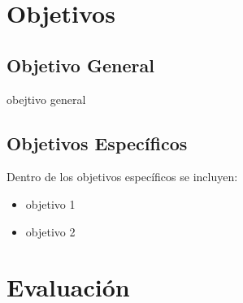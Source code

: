 \section{Objetivos}
\label{sec:objetivos}

\subsection{Objetivo General}

obejtivo general

\subsection{Objetivos Específicos}
Dentro de los objetivos específicos se incluyen:
   \begin{itemize}
   \item objetivo 1
   \item objetivo 2
   \end{itemize}
\iffalse
\section{Hipótesis}
\label{sec:hipotesis}

Las técnicas de ...

\subsection{Variables}
\subsubsection{Variables Independientes}
En el procesamiento de imágenes existen variables ...
\begin{itemize}
\item \textbf{variable 1},  Descripción de variable 1
\item \textbf{variable 2},  Descripción de variable 2
\end{itemize}
\subsubsection{Variables Dependientes}
Como variable dependiente ... 
\fi 

\section{Evaluación}

